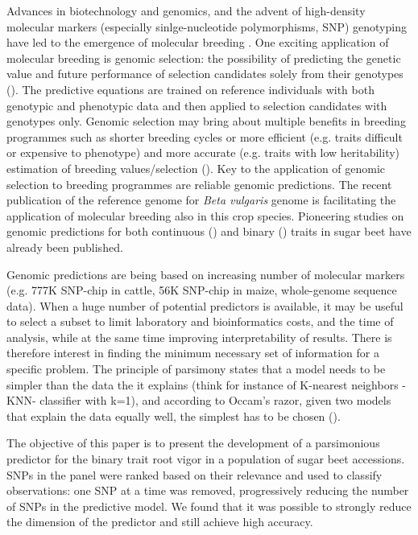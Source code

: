 Advances in biotechnology and genomics, and the advent of high-density
molecular markers (especially sinlge-nucleotide polymorphisms, SNP)
genotyping have led to the emergence of molecular breeding
\cite{moose2008molecular}.
One exciting application of molecular breeding is genomic selection: the possibility of predicting the genetic value and future
performance of selection candidates solely from their genotypes (\cite{meuwissen2001prediction}). The predictive equations are
trained on reference individuals with both genotypic and phenotypic data and then
applied to selection candidates with genotypes only. Genomic selection
may bring about multiple benefits in breeding programmes such as
shorter breeding cycles or more efficient (e.g. traits difficult or
expensive to phenotype) and more accurate (e.g. traits with low
heritability) estimation of breeding values/selection
(\cite{goddard2007genomic,heffner2010plant}).
Key to the application of genomic selection to breeding programmes are reliable genomic
predictions.
The recent publication of the reference genome for \emph{Beta
vulgaris} genome \cite{dohm2013genome} is facilitating the application
of molecular breeding also in this crop species. Pioneering studies on
genomic predictions for both continuous (\cite{hofheinz2012genome,wurschum2013genomic}) and binary
(\cite{biscarini2014genome}) traits in sugar beet have already been published.

Genomic predictions are being based on increasing number of molecular
markers (e.g. 777K SNP-chip in cattle, 56K SNP-chip in maize,
whole-genome sequence data). When a huge number of potential predictors
is available, it may be useful to select a subset to limit laboratory
and bioinformatics costs, and the time of analysis, while at the same
time improving interpretability of results. There is therefore interest
in finding the minimum necessary set of information for a specific
problem. The principle of parsimony states that
a model needs to be simpler than the data the it explains (think for
instance of K-nearest neighbors -KNN- classifier with k=1), and according to Occam's razor, given two models that explain the data
equally well, the simplest has to be chosen (\cite{chaitin2006limits}).

The objective of this paper is to present the development of a
parsimonious predictor for the binary trait root vigor in a population
of sugar beet accessions.
SNPs in the panel were ranked based on their relevance and used to classify observations: one SNP at a
time was removed, progressively reducing the number of SNPs in the
predictive model.
We found that it was possible to strongly reduce the dimension of the
predictor and still achieve high accuracy.


